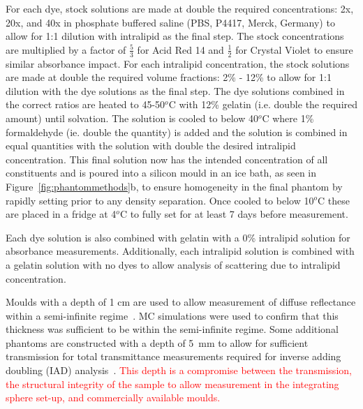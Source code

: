 \label{sec:methodsphantomsynthesis}
For each dye, stock solutions are made at double the required concentrations: 2x, 20x, and 40x in phosphate buffered saline (PBS, P4417, Merck, Germany) to allow for 1:1 dilution with intralipid as the final step. The stock concentrations are multiplied by a factor of $\frac{5}{3}$ for Acid Red 14 and $\frac{1}{2}$ for Crystal Violet to ensure similar absorbance impact. For each intralipid concentration, the stock solutions are made at double the required volume fractions: 2\% - 12\% to allow for 1:1 dilution with the dye solutions as the final step. The dye solutions combined in the correct ratios are heated to 45-50$^o$C with 12\% gelatin (i.e. double the required amount) until solvation. The solution is cooled to below 40$^o$C where 1\% formaldehyde (ie. double the quantity) is added and the solution is combined in equal quantities with the solution with double the desired intralipid concentration. This final solution now has the intended concentration of all constituents and is poured into a silicon mould in an ice bath, as seen in Figure~\ref{fig:phantommethods}b, to ensure homogeneity in the final phantom by rapidly setting prior to any density separation. Once cooled to below 10$^o$C these are placed in a fridge at 4$^o$C to fully set for at least 7 days before measurement. 

Each dye solution is also combined with gelatin with a 0\% intralipid solution for absorbance measurements.
Additionally, each intralipid solution is combined with a gelatin solution with no dyes to allow analysis of scattering due to intralipid concentration.

Moulds with a depth of 1 cm are used to allow measurement of diffuse reflectance within a semi-infinite regime~\citep{Zhang2014}.
MC simulations were used to confirm that this thickness was sufficient to be within the semi-infinite regime.
Some additional phantoms are constructed with a depth of 5~mm to allow for sufficient transmission for total transmittance measurements required for inverse adding doubling (IAD) analysis~\citep{Prahl2017}. \textcolor{red}{This depth is a compromise between the transmission, the structural integrity of the sample to allow measurement in the integrating sphere set-up, and commercially available moulds.}

